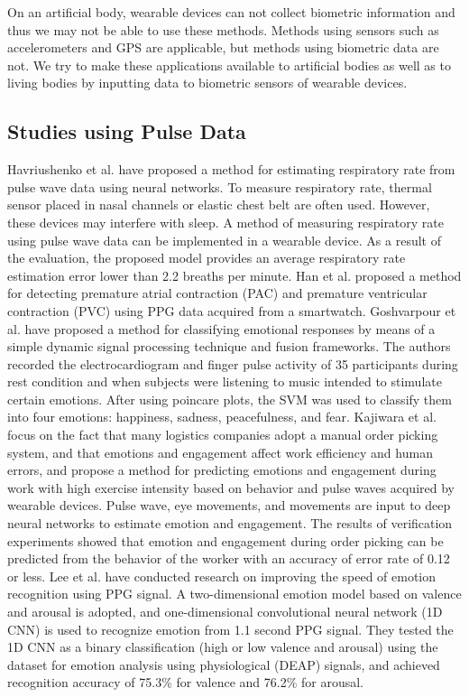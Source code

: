 \documentclass[sigchi,authordraft]{acmart}
\begin{document}
On an artificial body, wearable devices can not collect biometric information and thus we may not be able to use these methods. Methods using sensors such as accelerometers and GPS are applicable, but methods using biometric data are not. We try to make these applications available to artificial bodies as well as to living bodies by inputting data to biometric sensors of wearable devices.


\subsection{Studies using Pulse Data}
Havriushenko et al.\cite{respiratory_rate_estimation} have proposed a method for estimating respiratory rate from pulse wave data using neural networks. To measure respiratory rate, thermal sensor placed in nasal channels or elastic chest belt are often used. However, these devices may interfere with sleep. A method of measuring respiratory rate using pulse wave data can be implemented in a wearable device. As a result of the evaluation, the proposed model provides an average respiratory rate estimation error lower than 2.2 breaths per minute.
Han et al.\cite{arrhythmia_detection} proposed a method for detecting premature atrial contraction (PAC) and premature ventricular contraction (PVC) using PPG data acquired from a smartwatch.
Goshvarpour et al.\cite{emotion_recognition_poincare} have proposed a method for classifying emotional responses by means of a simple dynamic signal processing technique and fusion frameworks. The authors recorded the electrocardiogram and finger pulse activity of 35 participants during rest condition and when subjects were listening to music intended to stimulate certain emotions. After using poincare plots, the SVM was used to classify them into four emotions: happiness, sadness, peacefulness, and fear.
Kajiwara et al.\cite{pulse_order_picking} focus on the fact that many logistics companies adopt a manual order picking system, and that emotions and engagement affect work efficiency and human errors, and propose a method for predicting emotions and engagement during work with high exercise intensity based on behavior and pulse waves acquired by wearable devices. Pulse wave, eye movements, and movements are input to deep neural networks to estimate emotion and engagement. The results of verification experiments showed that emotion and engagement during order picking can be predicted from the behavior of the worker with an accuracy of error rate of 0.12 or less.
Lee et al.\cite{fast_emotion_recognition} have conducted research on improving the speed of emotion recognition using PPG signal. A two-dimensional emotion model based on valence and arousal is adopted, and one-dimensional convolutional neural network (1D CNN) is used to recognize emotion from 1.1 second PPG signal. They tested the 1D CNN as a binary classification (high or low valence and arousal) using the dataset for emotion analysis using physiological (DEAP) signals, and achieved recognition accuracy of 75.3\% for valence and 76.2\% for arousal.\par
\end{document}
